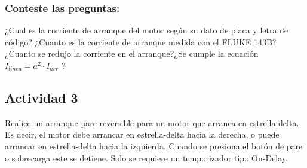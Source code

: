  
 
\subsubsection{Conteste las preguntas:}

¿Cual es la corriente de arranque del motor según su dato de placa y letra de código? ¿Cuanto es la corriente de arranque medida con el FLUKE 143B? ¿Cuanto se redujo la corriente en el arranque?¿Se cumple la ecuación $I_{linea} = a^{2}\cdot I_{arr}$ ?

\subsection{Actividad 3}

Realice un arranque pare reversible para un motor que arranca en estrella-delta. Es decir, el motor debe arrancar en estrella-delta hacia la derecha, o puede arrancar en estrella-delta hacia la izquierda. Cuando se presiona el botón de pare o sobrecarga este se detiene. Solo se requiere un temporizador tipo On-Delay.

